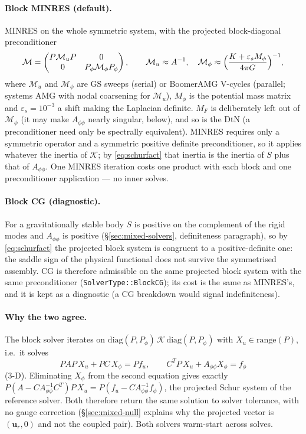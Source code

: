 \documentclass[11pt]{article}
\numberwithin{equation}{section}
\theoremstyle{remark}
\newcommand{\eps}{\varepsilon}
\newcommand{\vu}{\mathbf{u}}
\newcommand{\code}[1]{\texttt{#1}}
\begin{document}
\paragraph{Block MINRES (default).} MINRES on the whole symmetric system,
with the projected block-diagonal preconditioner
\begin{equation}
  \mathcal{M} = \begin{pmatrix} P\mathcal{M}_uP & 0\\ 0 &
     P_\phi\mathcal{M}_\phi P_\phi\end{pmatrix}, \qquad
  \mathcal{M}_u\approx A^{-1}, \quad
  \mathcal{M}_\phi\approx\Bigl(\frac{K + \eps_sM_\phi}{4\pi G}\Bigr)^{-1},
\end{equation}
where $\mathcal{M}_u$ and $\mathcal{M}_\phi$ are GS sweeps (serial) or
BoomerAMG V-cycles (parallel; systems AMG with nodal coarsening for $\mathcal{M}_u$),
$M_\phi$ is the potential mass matrix and $\eps_s = 10^{-3}$ a shift making
the Laplacian definite. $M_F$ is deliberately left out of
$\mathcal{M}_\phi$ (it may make $A_{\phi\phi}$ nearly singular, below),
and so is the DtN (a preconditioner need only be spectrally equivalent).
MINRES requires only a symmetric operator and a symmetric positive
definite preconditioner, so it applies whatever the inertia of
$\mathcal{K}$; by \eqref{eq:schurfact} that inertia is the inertia of $S$
plus that of $A_{\phi\phi}$. One MINRES iteration costs one product with
each block and one preconditioner application --- no inner solves.

\paragraph{Block CG (diagnostic).} For a gravitationally stable body $S$ is
positive on the complement of the rigid modes and $A_{\phi\phi}$ is
positive (\S\ref{sec:mixed-solvers}, definiteness paragraph), so by
\eqref{eq:schurfact} the projected block system is congruent to a
positive-definite one: the saddle sign of the physical functional does not
survive the symmetrised assembly. CG is therefore admissible on the same
projected block system with the same preconditioner
(\code{SolverType::BlockCG}); its cost is the same as MINRES's, and
it is kept as a diagnostic (a CG breakdown would signal indefiniteness).

\paragraph{Why the two agree.} The block solver iterates on
$\mathrm{diag}(P,P_\phi)\,\mathcal{K}\,\mathrm{diag}(P,P_\phi)$ with
$X_u\in\mathrm{range}(P)$, i.e.\ it solves
\[
  PAP\,X_u + PC\,X_\phi = Pf_u, \qquad C^TP\,X_u + A_{\phi\phi}X_\phi = f_\phi
\]
(3-D). Eliminating $X_\phi$ from the second equation gives exactly
$P(A - CA_{\phi\phi}^{-1}C^T)P\,X_u = P(f_u - CA_{\phi\phi}^{-1}f_\phi)$,
the projected Schur system of the reference solver. Both therefore return
the same solution to solver tolerance, with no gauge correction
(\S\ref{sec:mixed-null} explains why the projected vector is $(\vu_r, 0)$
and not the coupled pair). Both solvers warm-start across solves.
\end{document}
